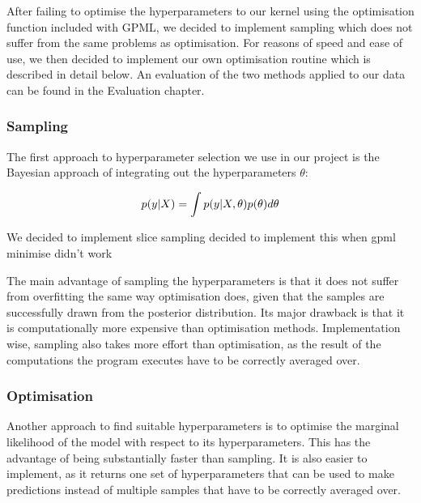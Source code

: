 \documentclass[a4paper,12pt,twoside,openright]{report}
\begin{document}
After failing to optimise the hyperparameters to our kernel using the optimisation function included with GPML, we decided to implement sampling which does not suffer from the same problems as optimisation. For reasons of speed and ease of use, we then decided to implement our own optimisation routine which is described in detail below. An evaluation of the two methods applied to our data can be found in the Evaluation chapter.


\subsubsection{Sampling}
The first approach to hyperparameter selection we use in our project is the Bayesian approach of integrating out the hyperparameters $\theta$:

\begin{equation}
p(y|X) = \int p(y|X,\theta)p(\theta)d\theta\\
\end{equation}

We decided to implement slice sampling
decided to implement this when gpml minimise didn't work

The main advantage of sampling the hyperparameters is that it does not suffer from overfitting the same way optimisation does, given that the samples are successfully drawn from the posterior distribution. Its major drawback is that it is computationally more expensive than optimisation methods. Implementation wise, sampling also takes more effort than optimisation, as the result of the computations the program executes have to be correctly averaged over.







\subsubsection{Optimisation}
Another approach to find suitable hyperparameters is to optimise the marginal likelihood of the model with respect to its hyperparameters. This has the advantage of being substantially faster than sampling. It is also easier to implement, as it returns one set of hyperparameters that can be used to make predictions instead of multiple samples that have to be correctly averaged over.
\end{document}
